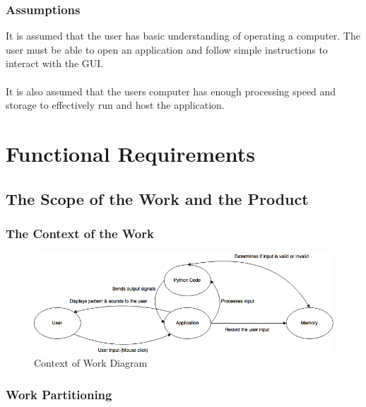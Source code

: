\documentclass[12pt, titlepage]{article}
\begin{document}
\subsubsection{Assumptions}
It is assumed that the user has basic understanding of operating a computer. The user must be able to open an application and follow simple instructions to interact with the GUI.\\
\\
It is also assumed that the users computer has enough processing speed and storage to effectively run and host the application.

\section{Functional Requirements}
\subsection{The Scope of the Work and the Product}

\subsubsection{The Context of the Work}

\begin {figure}[H]
	\includegraphics [width = \linewidth] {Context_Of_Work.png}
	\caption {Context of Work Diagram}
	\label {Figure: Context of Work}
\end {figure}
	

\subsubsection{Work Partitioning}
	
\end{document}
